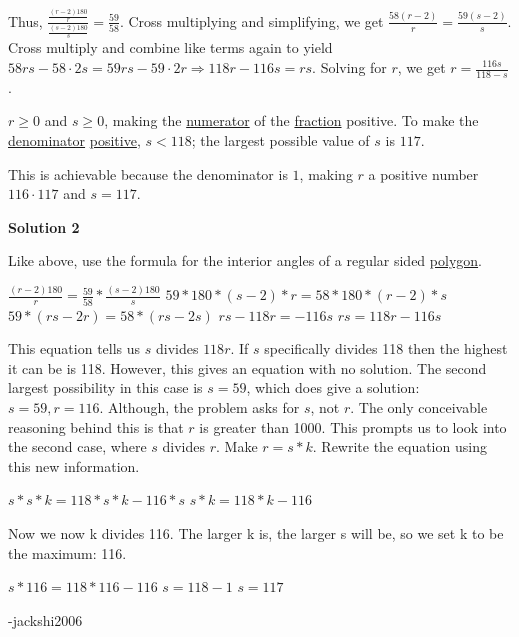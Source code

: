 \begin{enumerate}
 Thus, $\frac{\frac{(r-2)180}{r}}{\frac{(s-2)180}{s}} = \frac{59}{58}$. Cross multiplying and simplifying, we get $\frac{58(r-2)}{r} = \frac{59(s-2)}{s}$. Cross multiply and combine like terms again to yield $58rs - 58 \cdot 2s = 59rs - 59 \cdot 2r \Longrightarrow 118r - 116s = rs$. Solving for $r$, we get $r = \frac{116s}{118 - s}$.

 $r \ge 0$ and $s \ge 0$, making the \href{https://artofproblemsolving.com/wiki/index.php?title=Numerator}{numerator} of the \href{https://artofproblemsolving.com/wiki/index.php?title=Fraction}{fraction} positive. To make the \href{https://artofproblemsolving.com/wiki/index.php?title=Denominator}{denominator} \href{https://artofproblemsolving.com/wiki/index.php?title=Positive}{positive}, $s < 118$; the largest possible value of $s$ is $117$.

 This is achievable because the denominator is $1$, making $r$ a positive number $116 \cdot 117$ and $s = \boxed{117}$.

 



\textbf{Solution 2}

Like above, use the formula for the interior angles of a regular sided \href{https://artofproblemsolving.com/wiki/index.php?title=Polygon}{polygon}.

 
$\frac{(r-2)180}{r} = \frac{59}{58} * \frac{(s-2)180}{s}$
$59 * 180 * (s-2) * r = 58 * 180 * (r-2) * s$
$59 * (rs - 2r) = 58 * (rs - 2s)$
$rs - 118r = -116s$
$rs = 118r-116s$

 
This equation tells us $s$ divides $118r$. If $s$ specifically divides 118 then the highest it can be is 118. However, this gives an equation with no solution. The second largest possibility in this case is $s=59$, which does give a solution: $s=59, r=116$. Although, the problem asks for $s$, not $r$. The only conceivable reasoning behind this is that $r$ is greater than 1000. This prompts us to look into the second case, where $s$ divides $r$. Make $r = s * k$. Rewrite the equation using this new information.

 
$s * s * k = 118 * s * k - 116 * s$
$s * k = 118 * k - 116$

 
Now we now k divides 116. The larger k is, the larger s will be, so we set k to be the maximum: 116.

 
$s * 116 = 118 * 116 - 116$
$s = 118 - 1$
$s = \boxed{117}$

 
-jackshi2006

 



\end{enumerate}
